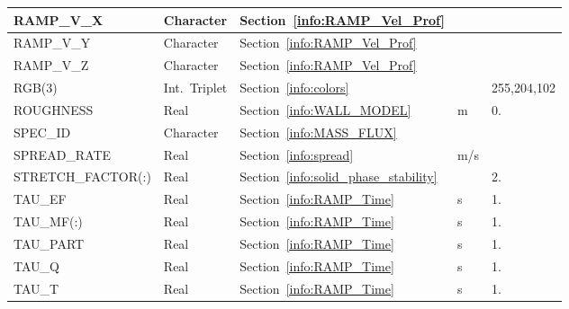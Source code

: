 \documentclass[11pt]{book}
\begin{document}
\begin{longtable}{@{\extracolsep{\fill}}|l|l|l|l|l|}
{\ct RAMP\_V\_X}                        & Character       & Section~\ref{info:RAMP_Vel_Prof}          &                     &                         \\ \hline
{\ct RAMP\_V\_Y}                        & Character       & Section~\ref{info:RAMP_Vel_Prof}          &                     &                         \\ \hline
{\ct RAMP\_V\_Z}                        & Character       & Section~\ref{info:RAMP_Vel_Prof}          &                     &                         \\ \hline
{\ct RGB(3)}                            & Int.~Triplet    & Section~\ref{info:colors}                 &                     & \small 255,204,102      \\ \hline
{\ct ROUGHNESS}                         & Real            & Section~\ref{info:WALL_MODEL}             & m                   & 0.                      \\ \hline
{\ct SPEC\_ID}                          & Character       & Section~\ref{info:MASS_FLUX}              &                     &                         \\ \hline
{\ct SPREAD\_RATE}                      & Real            & Section~\ref{info:spread}                 & m/s                 &                         \\ \hline
{\ct STRETCH\_FACTOR(:) }               & Real            & Section~\ref{info:solid_phase_stability}  &                     & 2.                      \\ \hline
{\ct TAU\_EF}                           & Real            & Section~\ref{info:RAMP_Time}              & s                   & 1.                      \\ \hline
{\ct TAU\_MF(:)}                        & Real            & Section~\ref{info:RAMP_Time}              & s                   & 1.                      \\ \hline
{\ct TAU\_PART}                         & Real            & Section~\ref{info:RAMP_Time}              & s                   & 1.                      \\ \hline
{\ct TAU\_Q}                            & Real            & Section~\ref{info:RAMP_Time}              & s                   & 1.                      \\ \hline
{\ct TAU\_T}                            & Real            & Section~\ref{info:RAMP_Time}              & s                   & 1.                      \\ \hline

\end{longtable}
\end{document}
